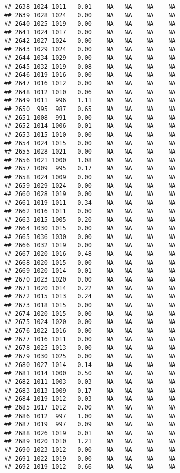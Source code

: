 \documentclass{article}\usepackage{graphicx, color}
\makeatletter
\newenvironment{kframe}{%
 \def\at@end@of@kframe{}%
 \ifinner\ifhmode%
  \def\at@end@of@kframe{\end{minipage}}%
  \begin{minipage}{\columnwidth}%
 \fi\fi%
 \def\FrameCommand##1{\hskip\@totalleftmargin \hskip-\fboxsep
 \colorbox{shadecolor}{##1}\hskip-\fboxsep
     \hskip-\linewidth \hskip-\@totalleftmargin \hskip\columnwidth}%
 \MakeFramed {\advance\hsize-\width
   \@totalleftmargin\z@ \linewidth\hsize
   \@setminipage}}%
 {\par\unskip\endMakeFramed%
 \at@end@of@kframe}
\newenvironment{knitrout}{}{} %
\makeatother
\begin{document}
\begin{knitrout}
\begin{kframe}
\begin{verbatim}
## 2638 1024 1011   0.01    NA   NA    NA    NA
## 2639 1028 1024   0.00    NA   NA    NA    NA
## 2640 1025 1019   0.00    NA   NA    NA    NA
## 2641 1024 1017   0.00    NA   NA    NA    NA
## 2642 1027 1024   0.00    NA   NA    NA    NA
## 2643 1029 1024   0.00    NA   NA    NA    NA
## 2644 1034 1029   0.00    NA   NA    NA    NA
## 2645 1032 1019   0.08    NA   NA    NA    NA
## 2646 1019 1016   0.00    NA   NA    NA    NA
## 2647 1016 1012   0.00    NA   NA    NA    NA
## 2648 1012 1010   0.06    NA   NA    NA    NA
## 2649 1011  996   1.11    NA   NA    NA    NA
## 2650  995  987   0.65    NA   NA    NA    NA
## 2651 1008  991   0.00    NA   NA    NA    NA
## 2652 1014 1006   0.01    NA   NA    NA    NA
## 2653 1015 1010   0.00    NA   NA    NA    NA
## 2654 1024 1015   0.00    NA   NA    NA    NA
## 2655 1028 1021   0.00    NA   NA    NA    NA
## 2656 1021 1000   1.08    NA   NA    NA    NA
## 2657 1009  995   0.17    NA   NA    NA    NA
## 2658 1024 1009   0.00    NA   NA    NA    NA
## 2659 1029 1024   0.00    NA   NA    NA    NA
## 2660 1028 1019   0.00    NA   NA    NA    NA
## 2661 1019 1011   0.34    NA   NA    NA    NA
## 2662 1016 1011   0.00    NA   NA    NA    NA
## 2663 1015 1005   0.20    NA   NA    NA    NA
## 2664 1030 1015   0.00    NA   NA    NA    NA
## 2665 1036 1030   0.00    NA   NA    NA    NA
## 2666 1032 1019   0.00    NA   NA    NA    NA
## 2667 1020 1016   0.48    NA   NA    NA    NA
## 2668 1020 1015   0.00    NA   NA    NA    NA
## 2669 1020 1014   0.01    NA   NA    NA    NA
## 2670 1023 1020   0.00    NA   NA    NA    NA
## 2671 1020 1014   0.22    NA   NA    NA    NA
## 2672 1015 1013   0.24    NA   NA    NA    NA
## 2673 1018 1015   0.00    NA   NA    NA    NA
## 2674 1020 1015   0.00    NA   NA    NA    NA
## 2675 1024 1020   0.00    NA   NA    NA    NA
## 2676 1022 1016   0.00    NA   NA    NA    NA
## 2677 1016 1011   0.00    NA   NA    NA    NA
## 2678 1025 1013   0.00    NA   NA    NA    NA
## 2679 1030 1025   0.00    NA   NA    NA    NA
## 2680 1027 1014   0.14    NA   NA    NA    NA
## 2681 1014 1000   0.50    NA   NA    NA    NA
## 2682 1011 1003   0.03    NA   NA    NA    NA
## 2683 1013 1009   0.17    NA   NA    NA    NA
## 2684 1019 1012   0.03    NA   NA    NA    NA
## 2685 1017 1012   0.00    NA   NA    NA    NA
## 2686 1012  997   1.00    NA   NA    NA    NA
## 2687 1019  997   0.09    NA   NA    NA    NA
## 2688 1026 1019   0.01    NA   NA    NA    NA
## 2689 1020 1010   1.21    NA   NA    NA    NA
## 2690 1023 1012   0.00    NA   NA    NA    NA
## 2691 1022 1019   0.00    NA   NA    NA    NA
## 2692 1019 1012   0.66    NA   NA    NA    NA

\end{verbatim}
\end{kframe}
\end{knitrout}
\end{document}
